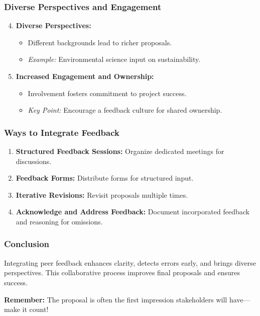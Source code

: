 \documentclass[aspectratio=169]{beamer}
\begin{document}
\begin{frame}[fragile]
    \frametitle{Diverse Perspectives and Engagement}
    \begin{enumerate}
        \setcounter{enumi}{3}
        \item \textbf{Diverse Perspectives:}
              \begin{itemize}
                  \item Different backgrounds lead to richer proposals.
                  \item \textit{Example:} Environmental science input on sustainability.
              \end{itemize}

        \item \textbf{Increased Engagement and Ownership:}
              \begin{itemize}
                  \item Involvement fosters commitment to project success.
                  \item \textit{Key Point:} Encourage a feedback culture for shared ownership.
              \end{itemize}
    \end{enumerate}
\end{frame}

\begin{frame}[fragile]
    \frametitle{Ways to Integrate Feedback}
    \begin{enumerate}
        \item \textbf{Structured Feedback Sessions:} Organize dedicated meetings for discussions.
        \item \textbf{Feedback Forms:} Distribute forms for structured input.
        \item \textbf{Iterative Revisions:} Revisit proposals multiple times.
        \item \textbf{Acknowledge and Address Feedback:} Document incorporated feedback and reasoning for omissions.
    \end{enumerate}
\end{frame}

\begin{frame}[fragile]
    \frametitle{Conclusion}
    Integrating peer feedback enhances clarity, detects errors early, and brings diverse perspectives. This collaborative process improves final proposals and ensures success.
    
    \textbf{Remember:} The proposal is often the first impression stakeholders will have—make it count!
\end{frame}
\end{document}
